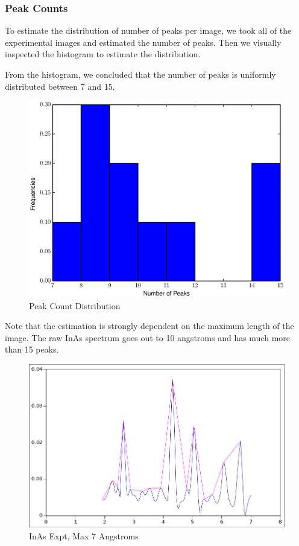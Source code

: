 \documentclass[12pt,letterpaper]{article}
\begin{document}
\subsubsection{Peak Counts}
To estimate the distribution of number of peaks per image, we took all of the
experimental images and estimated the number of peaks. Then we visually inspected
the histogram to estimate the distribution.

From the histogram, we concluded that the number of peaks is uniformly
distributed between 7 and 15.

\begin{figure}[ht]
  \begin{center}
    \includegraphics[scale=0.8]{figs/peak_counts_hist.eps}
    \caption{Peak Count Distribution}
  \end{center}
\end{figure}

Note that the estimation is strongly dependent on the maximum length of the
image. The raw InAs spectrum goes out to 10 angstroms and has much more than 15
peaks.

\begin{figure}[ht]
  \begin{center}
    \includegraphics[scale=0.5]{figs/inas_peaks_7ang.png}
    \caption{InAs Expt, Max 7 Angstroms}
  \end{center}
\end{figure}
\end{document}
